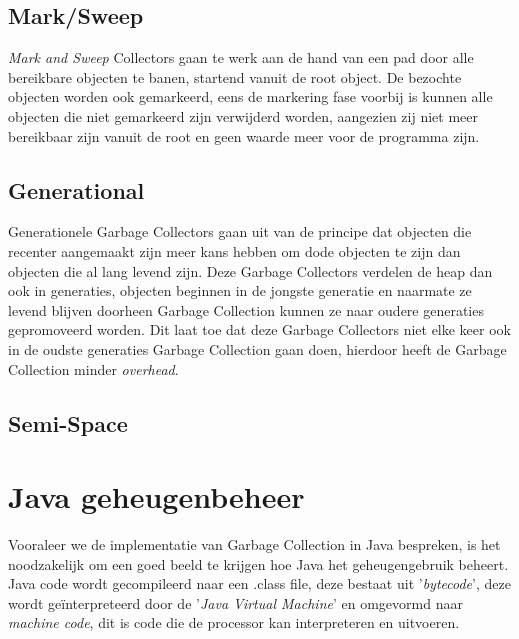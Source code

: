 \subsection{Mark/Sweep}
\textit{Mark and Sweep} Collectors gaan te werk aan de hand van een pad door alle bereikbare objecten te banen, startend vanuit de root object. De bezochte objecten worden ook gemarkeerd, eens de markering fase voorbij is kunnen alle objecten die niet gemarkeerd zijn verwijderd worden, aangezien zij niet meer bereikbaar zijn vanuit de root en geen waarde meer voor de programma zijn.


\subsection{Generational}
\label{sec:generational}    
Generationele Garbage Collectors gaan uit van de principe dat objecten die recenter aangemaakt zijn meer kans hebben om dode objecten te zijn dan objecten die al lang levend zijn.
Deze Garbage Collectors verdelen de heap dan ook in generaties, objecten beginnen in de jongste generatie en naarmate ze levend blijven doorheen Garbage Collection kunnen ze naar oudere generaties gepromoveerd worden.
Dit laat toe dat deze Garbage Collectors niet elke keer ook in de oudste generaties Garbage Collection gaan doen, hierdoor heeft de Garbage Collection minder \textit{overhead}. %


\subsection{Semi-Space}
\label{sec:semi-space}    

\section{Java geheugenbeheer}
\label{sec:java geheugenbeheer}
Vooraleer we de implementatie van Garbage Collection in Java bespreken, is het noodzakelijk om een goed beeld te krijgen hoe Java het geheugengebruik beheert.
Java code wordt gecompileerd naar een .class file, deze bestaat uit '\textit{bytecode}', deze wordt geïnterpreteerd door de '\textit{Java Virtual Machine}' en omgevormd naar \textit{machine code}, dit is code die de processor kan interpreteren en uitvoeren.

